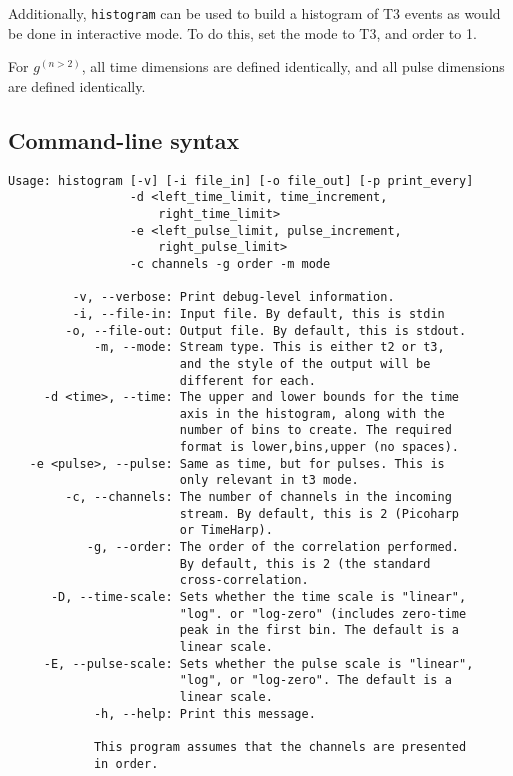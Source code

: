 \documentclass{article}
\newcommand{\histogram}{\texttt{histogram}}
\newcommand{\gn}[1]{\ensuremath{g^{(#1)}}}
\begin{document}
Additionally, \histogram{} can be used to build a histogram of T3 events as would be done in interactive mode. To do this, set the mode to T3, and order to 1.

For \gn{n>2}, all time dimensions are defined identically, and all pulse dimensions are defined identically.


\subsection{Command-line syntax}
\begin{verbatim}
Usage: histogram [-v] [-i file_in] [-o file_out] [-p print_every]
                 -d <left_time_limit, time_increment, 
                     right_time_limit> 
                 -e <left_pulse_limit, pulse_increment, 
                     right_pulse_limit> 
                 -c channels -g order -m mode

         -v, --verbose: Print debug-level information.
         -i, --file-in: Input file. By default, this is stdin
        -o, --file-out: Output file. By default, this is stdout.
            -m, --mode: Stream type. This is either t2 or t3, 
                        and the style of the output will be 
                        different for each.
     -d <time>, --time: The upper and lower bounds for the time
                        axis in the histogram, along with the 
                        number of bins to create. The required 
                        format is lower,bins,upper (no spaces).
   -e <pulse>, --pulse: Same as time, but for pulses. This is 
                        only relevant in t3 mode.
        -c, --channels: The number of channels in the incoming
                        stream. By default, this is 2 (Picoharp
                        or TimeHarp).
           -g, --order: The order of the correlation performed.
                        By default, this is 2 (the standard 
                        cross-correlation.
      -D, --time-scale: Sets whether the time scale is "linear", 
                        "log". or "log-zero" (includes zero-time
                        peak in the first bin. The default is a
                        linear scale.
     -E, --pulse-scale: Sets whether the pulse scale is "linear", 
                        "log", or "log-zero". The default is a 
                        linear scale.
            -h, --help: Print this message.

            This program assumes that the channels are presented
            in order.
\end{verbatim}
\end{document}
